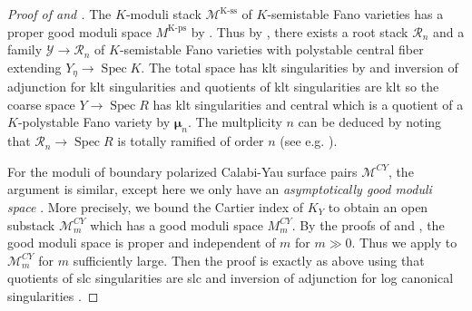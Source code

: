 \documentclass{amsart}
\theoremstyle{definition}
\newcommand{\cY}{\mathcal{Y}}
\newcommand{\cR}{\mathcal{R}}
\newcommand{\cM}{\mathcal{M}}
\newcommand{\bmu}{\pmb{\mu}}
\newcommand{\spec}{\operatorname{Spec}}
\newcommand{\marg}[1]{\normalsize{{\color{red}\footnote{{\color{blue}#1}}}{\marginpar[{\color{red}\hfill\tiny\thefootnote$\rightarrow$}]{{\color{red}$\leftarrow$\tiny\thefootnote}}}}}
\newcommand{\Gio}[1]{\marg{(Giovanni) #1}}
\begin{document}
\begin{proof}[Proof of  and ]

The $K$-moduli stack $\cM^{\text{K-ss}}$ of $K$-semistable Fano varieties has a proper good moduli space $M^{\text{K-ps}}$ by \cite{smoothable_Kmoduli, open_Kmoduli, gms_kmoduli, liu2022finite}. Thus by , there exists a root stack $\cR_n$ and a family $\cY \to \cR_n$ of $K$-semistable Fano varieties with polystable central fiber extending $Y_\eta \to \spec K$. The total space has klt singularities by \cite[Theorem 1.3]{odaka} and inversion of adjunction for klt singularities \cite[Sections 16 \& 17]{flipsandabundance} and quotients of klt singularities are klt
so the coarse space $Y \to \spec R$ has klt singularities and central which is a quotient of a $K$-polystable Fano variety by $\bmu_n$. The multplicity $n$ can be deduced by noting that $\cR_n \to \spec R$ is totally ramified of order $n$ (see e.g. \cite[Lemma 7.11]{bejleri2024heightmodulicyclotomicstacks}).

For the moduli of boundary polarized Calabi-Yau surface pairs $\cM^{CY}$, the argument is similar, except here we only have an \emph{asymptotically good moduli space} \cite[Definition 13.1]{ABBDILW}. More precisely, we bound the Cartier index of $K_Y$ to obtain an open substack $\cM^{CY}_m$ which has a good moduli space $M^{CY}_m$. By the proofs of \cite[Theorem 1.3]{ABBDILW} and \cite[Theorem 1.1]{blum2024goodmodulispacesboundary}, the good moduli space is proper and independent of $m$ for $m \gg 0$. Thus we apply  to $\cM^{CY}_m$ for $m$ sufficiently large. Then the proof is exactly as above using that quotients of slc singularities are slc \cite[Lemma 2.3]{alexeev2012non} and inversion of adjunction for log canonical singularities \cite[Main Theorem]{kawakita}.
\end{proof} 







\end{document}
